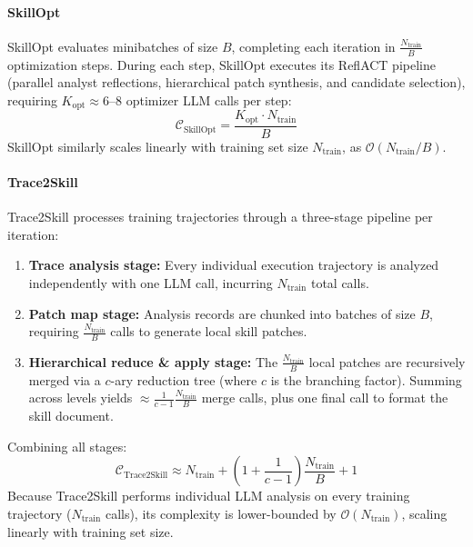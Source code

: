 \documentclass[11pt, a4paper, copyright, gr]{google}
\begin{document}
\paragraph{SkillOpt}
SkillOpt evaluates minibatches of size $B$, completing each iteration in $\frac{N_{\text{train}}}{B}$ optimization steps. During each step, SkillOpt executes its ReflACT pipeline (parallel analyst reflections, hierarchical patch synthesis, and candidate selection), requiring $K_{\text{opt}} \approx 6\text{--}8$ optimizer LLM calls per step:
\begin{equation}
\mathcal{C}_{\text{SkillOpt}} = \frac{K_{\text{opt}} \cdot N_{\text{train}}}{B}
\end{equation}
SkillOpt similarly scales linearly with training set size $N_{\text{train}}$, as $\mathcal{O}(N_{\text{train}}/B)$.
\paragraph{Trace2Skill}
Trace2Skill processes training trajectories through a three-stage pipeline per iteration:
\begin{enumerate}[wide=0pt]
\item \textbf{Trace analysis stage:} Every individual execution trajectory is analyzed independently with one LLM call, incurring $N_{\text{train}}$ total calls.
\item \textbf{Patch map stage:} Analysis records are chunked into batches of size $B$, requiring $\frac{N_{\text{train}}}{B}$ calls to generate local skill patches.
\item \textbf{Hierarchical reduce \& apply stage:} The $\frac{N_{\text{train}}}{B}$ local patches are recursively merged via a $c$-ary reduction tree (where $c$ is the branching factor). Summing across levels yields $\approx \frac{1}{c-1} \frac{N_{\text{train}}}{B}$ merge calls, plus one final call to format the skill document.
\end{enumerate}
Combining all stages:
\begin{equation}
\mathcal{C}_{\text{Trace2Skill}} \approx N_{\text{train}} + \left(1 + \frac{1}{c-1}\right) \frac{N_{\text{train}}}{B} + 1
\end{equation}
Because Trace2Skill performs individual LLM analysis on every training trajectory ($N_{\text{train}}$ calls), its complexity is lower-bounded by $\mathcal{O}(N_{\text{train}})$, scaling linearly with training set size.
\end{document}
